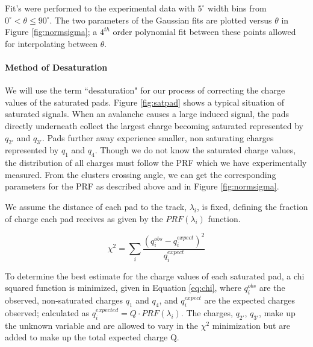 \documentclass[review]{elsarticle}
\begin{document}
Fit's were performed to the experimental data with  $5^{\circ}$ width bins from $0^{\circ} < \theta \leq 90^{\circ}$. The two parameters of the Gaussian fits are plotted versus $\theta$ in Figure \ref{fig:normsigma}; a $4^{th}$ order polynomial fit between these points allowed for interpolating between $\theta$.

\paragraph{Method of Desaturation}
We will use the term ``desaturation" for our process of correcting the charge values of the saturated pads. Figure \ref{fig:satpad} shows a typical situation of saturated signals. When an avalanche causes a large induced signal, the pads directly underneath collect the largest charge becoming saturated represented by $q_{2'}$ and $q_{3'}$. Pads further away experience smaller, non saturating charges represented by  $q_{1}$ and $q_{4}$. Though we do not know the saturated charge values, the distribution of all charges must follow the PRF which we have experimentally measured. From the clusters crossing angle, we can get the corresponding parameters for the PRF as described above and in Figure \ref{fig:normsigma}.

We assume the distance of each pad to the track, $\lambda_i$, is fixed, defining the fraction of charge each pad receives as given by the $PRF(\lambda_i)$ function. 


\begin{equation}\label{eq:chi}
\chi^2 = \sum_i \frac{(q_i^{obs} - q_i^{expect})^2}{q_i^{expect}}
\end{equation}

To determine the best estimate for the charge values of each saturated pad, a chi squared function is minimized, given in  Equation \ref{eq:chi}, where $q_i^{obs}$ are the observed, non-saturated charges $q_{1}$ and $q_{4}$, and $q_i^{expect}$ are the expected charges observed; calculated as $ q_i^{expected} = Q\cdot PRF(\lambda_i)$. The charges, $q_{2'}$, $q_{3'}$, make up the unknown variable and are allowed to vary in the $\chi^2$ minimization but are added to make up the total expected charge Q.
\end{document}
